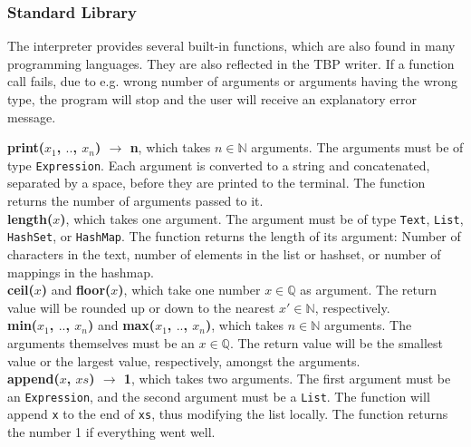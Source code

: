 \subsubsection{Standard Library}

The interpreter provides several built-in functions, which are also found in many programming languages. They are also reflected in the TBP writer. If a function call fails, due to e.g. wrong number of arguments or arguments having the wrong type, the program will stop and the user will receive an explanatory error message. \hfill \\



\textbf{print($x_{1}$, $..$, $x_{n}$) $\xrightarrow{}$ n}, which takes $n \in \mathbb{N}$ arguments. The arguments must be of type \texttt{Expression}. Each argument is converted to a string and concatenated, separated by a space, before they are printed to the terminal. The function returns the number of arguments passed to it. \hfill \\

\textbf{length($x$)}, which takes one argument. The argument must be of type \texttt{Text}, \texttt{List}, \texttt{HashSet}, or \texttt{HashMap}. The function returns the length of its argument: Number of characters in the text, number of elements in the list or hashset, or number of mappings in the hashmap. \hfill \\

\textbf{ceil($x$)} and \textbf{floor($x$)}, which take one number $x \in \mathbb{Q}$ as argument. The return value will be rounded up or down to the nearest $x' \in \mathbb{N}$, respectively. \hfill \\

\textbf{min($x_{1}$, $..$, $x_{n}$)} and \textbf{max($x_{1}$, $..$, $x_{n}$)}, which takes $n \in \mathbb{N}$ arguments. The arguments themselves must be an $x \in \mathbb{Q}$. The return value will be the smallest value or the largest value, respectively, amongst the arguments. \hfill \\

\textbf{append($x$, $xs$) $\xrightarrow{}$ 1}, which takes two arguments. The first argument must be an \texttt{Expression}, and the second argument must be a \texttt{List}. The function will append \texttt{x} to the end of \texttt{xs}, thus modifying the list locally. The function returns the number 1 if everything went well. \hfill \\

